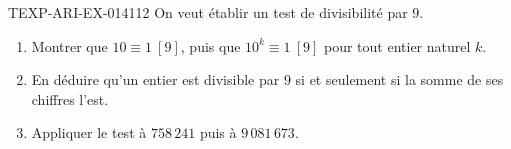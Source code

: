 \begin{exercice}{TEXP-ARI-EX-014}{1}{12}
On veut établir un test de divisibilité par $9$.
\begin{enumerate}
  \item Montrer que $10\equiv1\ [9]$, puis que $10^k\equiv1\ [9]$ pour tout
        entier naturel $k$.
  \item En déduire qu'un entier est divisible par $9$ si et seulement si la
        somme de ses chiffres l'est.
  \item Appliquer le test à $758\,241$ puis à $9\,081\,673$.
\end{enumerate}
\end{exercice}
